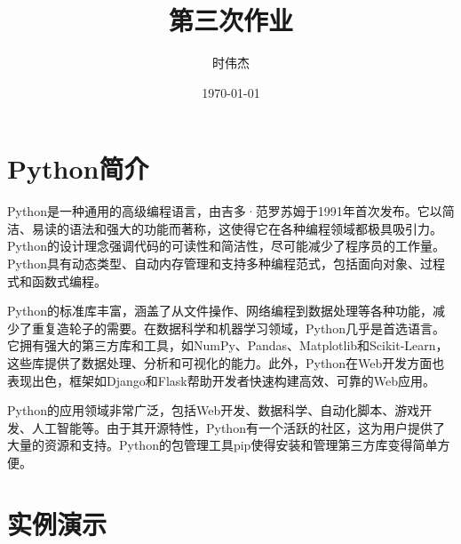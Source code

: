 \documentclass{article}
\title{第三次作业}
\author{时伟杰}
\date{\today}
\begin{document}
\maketitle

\section{Python简介}
Python是一种通用的高级编程语言，由吉多·范罗苏姆于1991年首次发布。它以简洁、易读的语法和强大的功能而著称，这使得它在各种编程领域都极具吸引力。Python的设计理念强调代码的可读性和简洁性，尽可能减少了程序员的工作量。Python具有动态类型、自动内存管理和支持多种编程范式，包括面向对象、过程式和函数式编程。

Python的标准库丰富，涵盖了从文件操作、网络编程到数据处理等各种功能，减少了重复造轮子的需要。在数据科学和机器学习领域，Python几乎是首选语言。它拥有强大的第三方库和工具，如NumPy、Pandas、Matplotlib和Scikit-Learn，这些库提供了数据处理、分析和可视化的能力。此外，Python在Web开发方面也表现出色，框架如Django和Flask帮助开发者快速构建高效、可靠的Web应用。

Python的应用领域非常广泛，包括Web开发、数据科学、自动化脚本、游戏开发、人工智能等。由于其开源特性，Python有一个活跃的社区，这为用户提供了大量的资源和支持。Python的包管理工具pip使得安装和管理第三方库变得简单方便。

\newpage
\section{实例演示}
\end{document}
